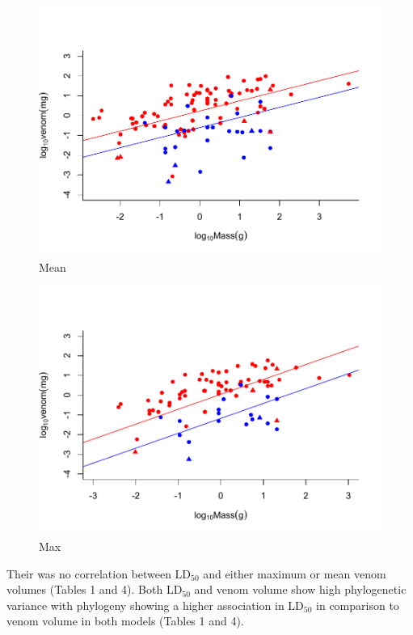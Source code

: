 \begin{figure}[h!]
  \centering
  \includegraphics[width=.95\textwidth]{ch4-snakes/figure2aver.pdf}%
  \caption[Figure 2a.]{Mean}
  \label{fig:Figure 1.}
\end{figure}




\begin{figure}[h!]
  \centering
  \includegraphics[width=.95\textwidth]{ch4-snakes/figure2max.pdf}%
  \caption[Figure 2b.]{Max}
  \label{fig:Figure 2b.}
\end{figure}



Their was no correlation between LD$_{50}$ and either maximum or mean venom volumes (Tables 1 and 4). Both LD$_{50}$  and venom volume show high phylogenetic variance with phylogeny showing a higher association in LD$_{50}$ in comparison to venom volume in both models (Tables 1 and 4). 

